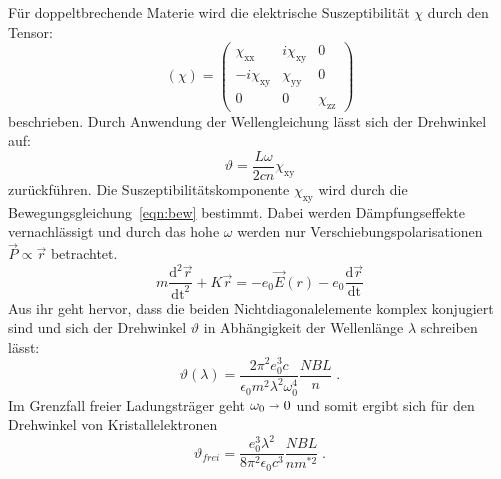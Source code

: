 Für doppeltbrechende Materie wird die elektrische Suszeptibilität $\chi$ durch den Tensor:
\begin{equation}
  (\chi)=
  \begin{pmatrix}
  \chi_\text{xx} & i\chi_\text{xy} & 0\\
    -i\chi_\text{xy} & \chi_\text{yy} & 0\\
    0 & 0 & \chi_\text{zz}
  \end{pmatrix}
\end{equation}
beschrieben. Durch Anwendung der Wellengleichung lässt sich der Drehwinkel auf:
\begin{equation}
  \vartheta = \frac{L\omega}{2cn}\chi_\text{xy}
\end{equation}
zurückführen. Die Suszeptibilitätskomponente $\chi_\text{xy}$ wird durch die Bewegungsgleichung~\eqref{eqn:bew} bestimmt. Dabei werden Dämpfungseffekte
vernachlässigt und durch das hohe $\omega$ werden nur Verschiebungspolarisationen $\vec{P} \propto \vec{r}$ betrachtet.
\begin{equation}
   m \frac{\text{d}^2\vec{r}}{\text{dt}^2} + K\vec{r} = -e_0\vec{E}(r) - e_0\frac{\text{d}\vec{r}}{\text{dt}}
   \label{eqn:bew}
\end{equation}
Aus ihr geht hervor, dass die beiden Nichtdiagonalelemente komplex konjugiert sind und sich der Drehwinkel $\vartheta$ in Abhängigkeit der
Wellenlänge $\lambda$ schreiben lässt:
\begin{equation}
  \vartheta(\lambda) = \frac{2\pi^2e_0^3c}{\epsilon_0 m^2\lambda^2\omega_0^4}\frac{NBL}{n}\;.
\end{equation}
Im Grenzfall freier Ladungsträger geht $\omega_0 \shortrightarrow 0$ und somit ergibt sich für den Drehwinkel von Kristallelektronen
\begin{equation}
  \vartheta_{frei} = \frac{e_0^3\lambda^2}{8\pi^2\epsilon_0c^3}\frac{NBL}{n m^{*2}}\;.
  \label{eq:frei}
\end{equation}
